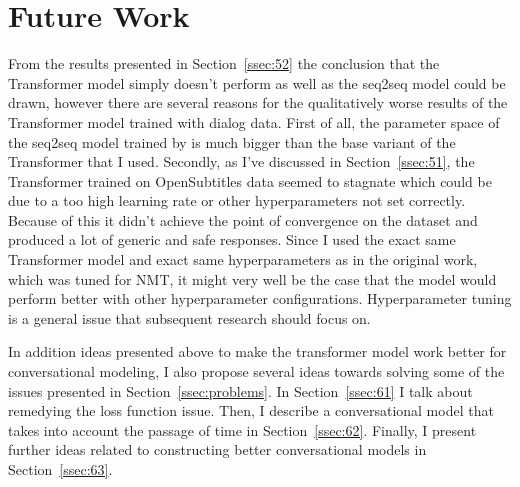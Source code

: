 \documentclass[12pt]{article}
\begin{document}
\newpage\section{Future Work} \label{sec:future}
From the results presented in Section~\ref{ssec:52} the conclusion that the Transformer model simply doesn't perform as well as the seq2seq model could be drawn, however there are several reasons for the qualitatively worse results of the Transformer model trained with dialog data. First of all, the parameter space of the seq2seq model trained by \cite{Vinyals:2015} is much bigger than the base variant of the Transformer that I used. Secondly, as I've discussed in Section~\ref{ssec:51}, the Transformer trained on OpenSubtitles data seemed to stagnate which could be due to a too high learning rate or other hyperparameters not set correctly. Because of this it didn't achieve the point of convergence on the dataset and produced a lot of generic and safe responses. Since I used the exact same Transformer model and exact same hyperparameters as in the original work, which was tuned for NMT, it might very well be the case that the model would perform better with other hyperparameter configurations. Hyperparameter tuning is a general issue that subsequent research should focus on.

In addition ideas presented above to make the transformer model work better for conversational modeling, I also propose several ideas towards solving some of the issues presented in Section~\ref{ssec:problems}. In Section~\ref{ssec:61} I talk about remedying the loss function issue. Then, I describe a conversational model that takes into account the passage of time in Section~\ref{ssec:62}. Finally, I present further ideas related to constructing better conversational models in Section~\ref{ssec:63}.
\end{document}

